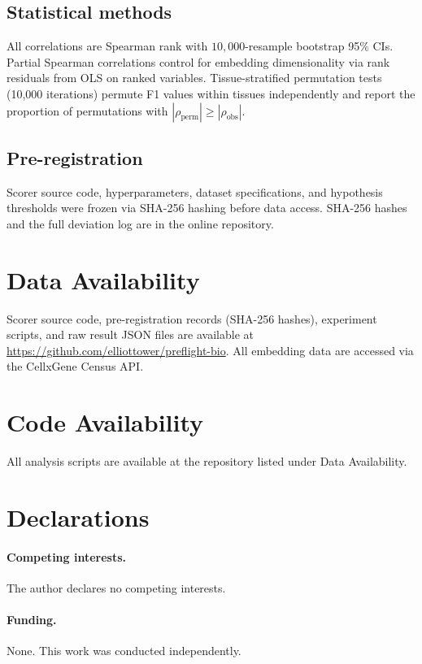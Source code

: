 \documentclass[11pt]{article}
\begin{document}
\subsection{Statistical methods}

All correlations are Spearman rank with $10{,}000$-resample bootstrap
95\% CIs. Partial Spearman correlations control for embedding
dimensionality via rank residuals from OLS on ranked variables.
Tissue-stratified permutation tests (10,000 iterations) permute F1
values within tissues independently and report the proportion of
permutations with $|\rho_{\mathrm{perm}}| \geq |\rho_{\mathrm{obs}}|$.

\subsection{Pre-registration}

Scorer source code, hyperparameters, dataset specifications, and
hypothesis thresholds were frozen via SHA-256 hashing before data
access. SHA-256 hashes and the full deviation log are in the online
repository.


\section*{Data Availability}

Scorer source code, pre-registration records (SHA-256 hashes),
experiment scripts, and raw result JSON files are available at
\url{https://github.com/elliottower/preflight-bio}. All embedding data
are accessed via the CellxGene Census API.

\section*{Code Availability}

All analysis scripts are available at the repository listed under Data
Availability.

\section*{Declarations}

\paragraph{Competing interests.} The author declares no competing
interests.

\paragraph{Funding.} None. This work was conducted independently.
\end{document}
